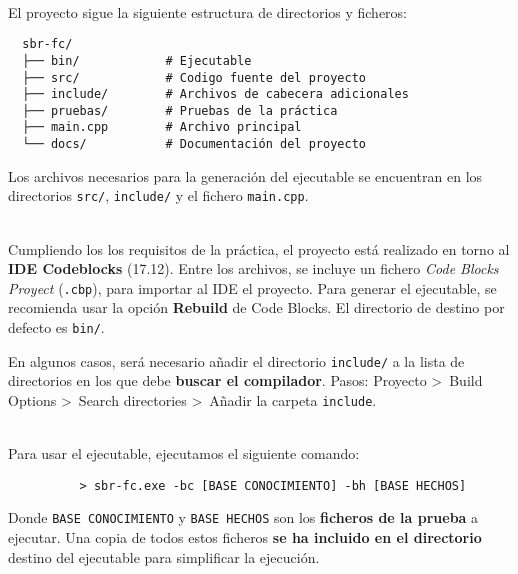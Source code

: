 \documentclass[a4paper,11pt, includehead]{article}
\title{
	\vspace{-5ex}
	{\large \textsc{\subject}}\\[1ex]
	\hrule
	\vspace{3ex}
	{\huge \textsc{\underline{Sistemas Basados en Reglas:}}}\\
	{\huge \textsc{\underline{Manual de Usuario}}}\\[2ex]
	{\small Hugo Sánchez Martínez\\[-2ex]
	\texttt{hugo.s.m@um.es}} %
	
	\vspace{2ex}
	\hrule
	\vspace{2ex}
	{\normalsize \textsc{Facultad de Informática - Universidad de Murcia}\\[-1ex] Diciembre 2024}
	}
\date{} %
\begin{document}
	
\maketitle %

\pagestyle{fancy}

\fancyhf{} %
\fancyfoot[R]{\thepage}
\setlength{\headsep}{4ex}

\setcounter{page}{1}

\vspace{-3ex}

\\

\noindent El proyecto sigue la siguiente estructura de directorios y ficheros:

\begin{verbatim}
  sbr-fc/
  ├── bin/            # Ejecutable
  ├── src/            # Codigo fuente del proyecto
  ├── include/        # Archivos de cabecera adicionales
  ├── pruebas/        # Pruebas de la práctica
  ├── main.cpp        # Archivo principal
  └── docs/           # Documentación del proyecto
\end{verbatim}

Los archivos necesarios para la generación del ejecutable se encuentran en los directorios \texttt{src/}, \texttt{include/} y el fichero \texttt{main.cpp}.

\vspace{4ex}

\\

Cumpliendo los los requisitos de la práctica, el proyecto está realizado en torno al \textbf{IDE Codeblocks} (17.12). Entre los archivos, se incluye un fichero \textit{Code Blocks Proyect} (\texttt{.cbp}), para importar al IDE el proyecto. Para generar el ejecutable, se recomienda usar la opción \textbf{Rebuild} de Code Blocks. El directorio de destino por defecto es \texttt{bin/}.

\begin{mdframed}[style=warning]
	En algunos casos, será necesario añadir el directorio \texttt{include/} a la lista de directorios en los que debe \textbf{buscar el compilador}. Pasos: Proyecto >\ Build Options >\ Search directories >\ Añadir la carpeta \texttt{include}.
\end{mdframed}

\vspace{4ex}

\\

\noindent Para usar el ejecutable, ejecutamos el siguiente comando:

\begin{verbatim}
          > sbr-fc.exe -bc [BASE CONOCIMIENTO] -bh [BASE HECHOS]
\end{verbatim}

Donde \texttt{BASE CONOCIMIENTO} y \texttt{BASE HECHOS} son los \textbf{ficheros de la prueba} a ejecutar. Una copia de todos estos ficheros \textbf{se ha incluido en el directorio} destino del ejecutable para simplificar la ejecución.
\end{document}

